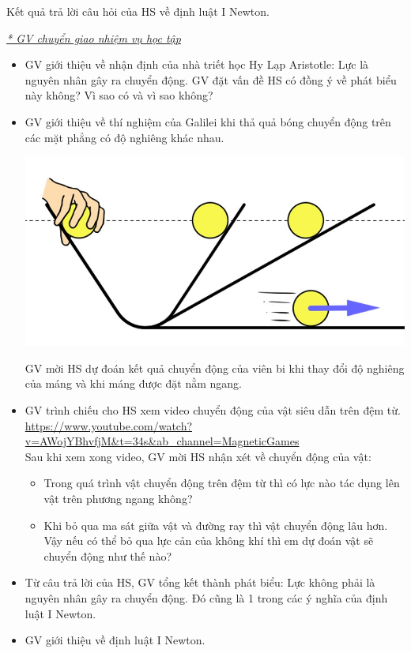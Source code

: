 {Kết quả trả lời câu hỏi của HS về định luật I Newton.
}
{\textit{\underline{* GV chuyển giao nhiệm vụ học tập}}
		\begin{itemize}[label=-]
			\item GV giới thiệu về nhận định của nhà triết học Hy Lạp Aristotle: Lực là nguyên nhân gây ra chuyển động. GV đặt vấn đề HS có đồng ý về phát biểu này không? Vì sao có và vì sao không?
			\item GV giới thiệu về thí nghiệm của Galilei khi thả quả bóng chuyển động trên các mặt phẳng có độ nghiêng khác nhau.
			\begin{center}
				\includegraphics[scale=0.4]{figs/G10-BAI10-3}
			\end{center}
			GV mời HS dự đoán kết quả chuyển động của viên bi khi thay đổi độ nghiêng của máng và khi máng được đặt nằm ngang.
			\item GV trình chiếu cho HS xem video chuyển động của vật siêu dẫn trên đệm từ.\\
			\url{https://www.youtube.com/watch?v=AWojYBhvfjM&t=34s&ab_channel=MagneticGames}\\
			Sau khi xem xong video, GV mời HS nhận xét về chuyển động của vật:
			\begin{itemize}[label=$\bullet$]
				\item Trong quá trình vật chuyển động trên đệm từ thì có lực nào tác dụng lên vật trên phương ngang không?
				\item Khi bỏ qua ma sát giữa vật và đường ray thì vật chuyển động lâu hơn. Vậy nếu có thể bỏ qua lực cản của không khí thì em dự đoán vật sẽ chuyển động như thế nào?
			\end{itemize}
			\item Từ câu trả lời của HS, GV tổng kết thành phát biểu: Lực không phải là nguyên nhân gây ra chuyển động. Đó cũng là 1 trong các ý nghĩa của định luật I Newton.
			\item GV giới thiệu về định luật I Newton.

\end{itemize}}
